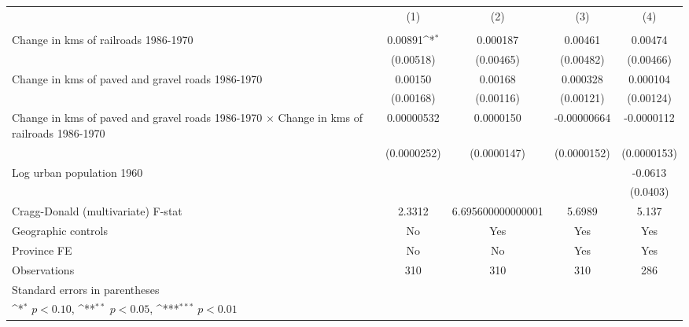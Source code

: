 {
\def\sym#1{\ifmmode^{#1}\else\(^{#1}\)\fi}
\begin{tabular}{l*{4}{c}}
\hline\hline
                &\multicolumn{1}{c}{(1)}&\multicolumn{1}{c}{(2)}&\multicolumn{1}{c}{(3)}&\multicolumn{1}{c}{(4)}\\
                &\multicolumn{1}{c}{}&\multicolumn{1}{c}{}&\multicolumn{1}{c}{}&\multicolumn{1}{c}{}\\
\hline
Change in kms of railroads 1986-1970&  0.00891\sym{*}  & 0.000187         &  0.00461         &  0.00474         \\
                &(0.00518)         &(0.00465)         &(0.00482)         &(0.00466)         \\
[1em]
Change in kms of paved and gravel roads 1986-1970&  0.00150         &  0.00168         & 0.000328         & 0.000104         \\
                &(0.00168)         &(0.00116)         &(0.00121)         &(0.00124)         \\
[1em]
Change in kms of paved and gravel roads 1986-1970 $\times$ Change in kms of railroads 1986-1970&0.00000532         &0.0000150         &-0.00000664         &-0.0000112         \\
                &(0.0000252)         &(0.0000147)         &(0.0000152)         &(0.0000153)         \\
[1em]
Log urban population 1960&                  &                  &                  &  -0.0613         \\
                &                  &                  &                  & (0.0403)         \\
\hline
Cragg-Donald (multivariate) F-stat&   2.3312         &6.695600000000001         &   5.6989         &    5.137         \\
Geographic controls&       No         &      Yes         &      Yes         &      Yes         \\
Province FE     &       No         &       No         &      Yes         &      Yes         \\
Observations    &      310         &      310         &      310         &      286         \\
\hline\hline
\multicolumn{5}{l}{\footnotesize Standard errors in parentheses}\\
\multicolumn{5}{l}{\footnotesize \sym{*} \(p<0.10\), \sym{**} \(p<0.05\), \sym{***} \(p<0.01\)}\\
\end{tabular}
}
